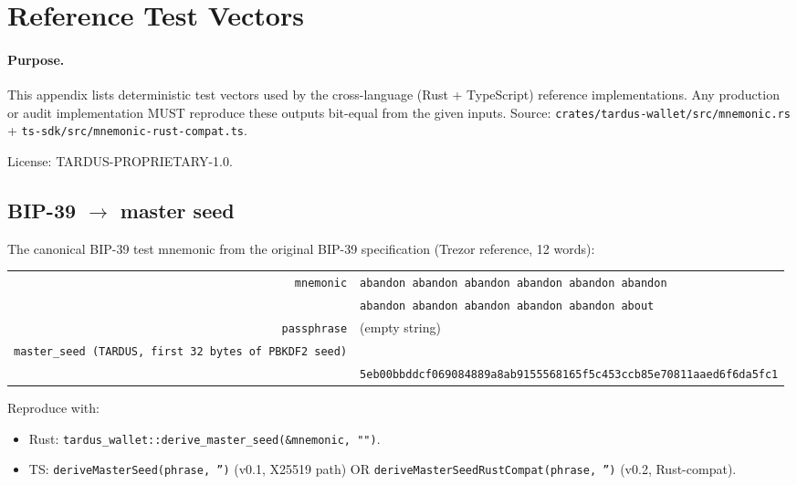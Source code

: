 \appendix

\section{Reference Test Vectors}
\label{sec:appendix-vectors}

\paragraph{Purpose.} This appendix lists deterministic test
vectors used by the cross-language (Rust + TypeScript)
reference implementations. Any production or audit
implementation MUST reproduce these outputs bit-equal from the
given inputs. Source: \texttt{crates/tardus-wallet/src/mnemonic.rs}
+ \texttt{ts-sdk/src/mnemonic-rust-compat.ts}.

License: TARDUS-PROPRIETARY-1.0.

\subsection{BIP-39 \texorpdfstring{$\to$}{->} master seed}
\label{sec:vec-master-seed}

The canonical BIP-39 test mnemonic from the original BIP-39
specification (Trezor reference, 12 words):

\begin{center}\small
\begin{tabular}{rl}
\toprule
\texttt{mnemonic}      & \texttt{abandon abandon abandon abandon abandon abandon} \\
                       & \texttt{abandon abandon abandon abandon abandon about}   \\
\texttt{passphrase}    & (empty string)                                            \\
\texttt{master\_seed (TARDUS, first 32 bytes of PBKDF2 seed)} & \\
                       & \texttt{5eb00bbddcf069084889a8ab9155568165f5c453ccb85e70811aaed6f6da5fc1} \\
\bottomrule
\end{tabular}
\end{center}

Reproduce with:
\begin{itemize}[leftmargin=2em,itemsep=0pt]
  \item Rust: \texttt{tardus\_wallet::derive\_master\_seed(\&mnemonic, "")}.
  \item TS: \texttt{deriveMasterSeed(phrase, '')} (v0.1, X25519 path) OR
        \texttt{deriveMasterSeedRustCompat(phrase, '')} (v0.2,
        Rust-compat).
\end{itemize}

